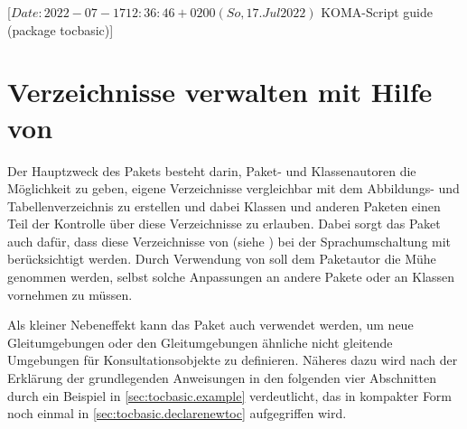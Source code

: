 %
%
%
%
%
%
%

                 [$Date: 2022-07-17 12:36:46 +0200 (So, 17. Jul 2022) $
                  KOMA-Script guide (package tocbasic)]

\chapter{Verzeichnisse verwalten mit Hilfe von }

\BeginIndexGroup
{}%
%
%
Der Hauptzweck des Pakets  besteht darin, Paket- und
Klassenautoren die Möglichkeit zu geben, eigene Verzeichnisse vergleichbar mit
dem Abbildungs- und Tabellenverzeichnis zu erstellen und dabei Klassen und
anderen Paketen einen Teil der Kontrolle über diese Verzeichnisse zu
erlauben. Dabei sorgt das Paket  auch dafür, dass diese
Verzeichnisse von  (siehe
\cite{package:babel}) bei der Sprachumschaltung mit berücksichtigt
werden. Durch Verwendung von  soll dem Paketautor die Mühe
genommen werden, selbst solche Anpassungen an andere Pakete oder an Klassen
vornehmen zu müssen.

Als kleiner Nebeneffekt kann das Paket auch verwendet werden, um neue
Gleitumgebungen oder den Gleitumgebungen ähnliche nicht gleitende Umgebungen
für Konsultationsobjekte zu definieren. Näheres dazu wird nach der Erklärung
der grundlegenden Anweisungen in den folgenden vier Abschnitten durch ein
Beispiel in \autoref{sec:tocbasic.example} verdeutlicht, das in kompakter Form
noch einmal in \autoref{sec:tocbasic.declarenewtoc} aufgegriffen wird.

